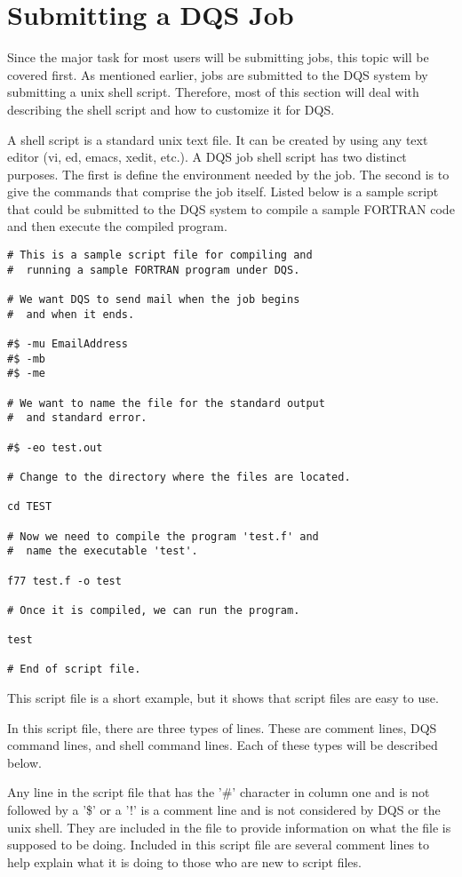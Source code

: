 \section{Submitting a DQS Job}

Since the major task for most users will be submitting jobs, this
topic will be covered first.  As mentioned earlier, jobs are submitted
to the DQS system by submitting a unix shell script.  Therefore, most
of this section will deal with describing the shell script and how to
customize it for DQS.

A shell script is a standard unix text file.  It can be created by
using any text editor (vi, ed, emacs, xedit, etc.).
A DQS job shell script has two distinct purposes.  The first is define the
environment needed by the job.  The second is to give the commands that
comprise the job itself.
Listed below is a sample script that could be submitted to the
DQS system to compile a sample FORTRAN code and then execute the
compiled program.

\begin{verbatim}
# This is a sample script file for compiling and
#  running a sample FORTRAN program under DQS.

# We want DQS to send mail when the job begins
#  and when it ends.

#$ -mu EmailAddress
#$ -mb
#$ -me

# We want to name the file for the standard output
#  and standard error.

#$ -eo test.out

# Change to the directory where the files are located.

cd TEST

# Now we need to compile the program 'test.f' and
#  name the executable 'test'.

f77 test.f -o test

# Once it is compiled, we can run the program.

test

# End of script file.
\end{verbatim}

This script file is a short example, but it shows that script files
are easy to use.

In this script file, there are three types of lines.  These are
comment lines, DQS command lines, and shell command lines.  Each of
these types will be described below.

Any line in the script file that has the '\#' character in column one and is
not followed by a '\$' or a '!' is a comment line and is not considered
by DQS or the unix shell.  They are included in the file to
provide information on what the file is supposed to be doing.  Included
in this script file are several comment lines to help explain what it
is doing to those who are new to script files.

